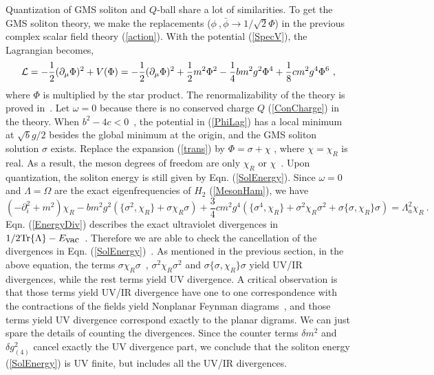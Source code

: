 \documentclass[a4paper,a4paper]{article}
\def\Tr{{\hbox{Tr}}}
\def\bphi{\bar{\phi}} \def\hphi{\hat{\phi}}
\def\hvac{{\hbox{vac}}}
\begin{document}
Quantization of GMS soliton and $Q$-ball share a lot of similarities.  
To get the GMS soliton theory, we make the replacements 
($\phi\ ,\bphi\rightarrow 1/{\sqrt{2}}\Phi$) in the previous
complex scalar field theory (\ref{action}). With the potential (\ref{SpecV}), 
the Lagrangian becomes,
\begin{equation}
  {\cal L}=-\frac 12(\partial_\mu\Phi)^2+V(\Phi)=-\frac 12(\partial_\mu\Phi)^2+\frac 12m^2\Phi^2
-\frac 14bm^2g^2\Phi^4+\frac 18cm^2g^4\Phi^6\ ,                                                     \label{PhiLag}
\end{equation}
where $\Phi$ is multiplied by the star product. The renormalizability of the theory is
proved in~\cite{Chepelev}. Let $\omega=0$ because there is no 
conserved charge $Q$ (\ref{ConCharge}) in the theory. When $b^2-4c<0$\ ,
the potential in (\ref{PhiLag}) has a local minimum at $\sqrt{b}g/2$ besides the global 
minimum at the origin, and the GMS soliton solution $\sigma$ exists. 
Replace the expansion (\ref{trans}) by $\Phi=\sigma+\chi$ , where $\chi=\chi_R$ is 
real. As a result, the meson degrees of freedom are only $\chi_R$ or $\chi$\ . 
Upon quantization, the soliton energy is still given by Eqn. (\ref{SolEnergy}).
Since $\omega=0$ and $\Lambda=\Omega$ are the exact eigenfrequencies of $H_2$ (\ref{MesonHam}),
we have 
\begin{equation}
  (-\partial_i^2+m^2)\chi_R
-bm^2g^2(\{\sigma^2,\chi_R\}+\sigma\chi_R\sigma)
+\frac 34cm^2g^4(\{\sigma^4,\chi_R\}+\sigma^2\chi_R\sigma^2+\sigma\{\sigma,\chi_R\}\sigma)
=\Lambda_{a}^2\chi_R\ . 
\end{equation}
Eqn. (\ref{EnergyDiv}) describes the exact ultraviolet divergences in $1/2\Tr\{\Lambda\}
-E_\hvac$\ . Therefore we are able to check the cancellation of the divergences in Eqn. 
(\ref{SolEnergy})\ . As mentioned in the previous section, in the above equation, 
the terms $\sigma\chi_R\sigma$\ , $\sigma^2\chi_R\sigma^2$ and 
$\sigma\{\sigma,\chi_R\}\sigma$ yield UV/IR divergences, while the rest terms yield UV 
divergence. A critical observation is that those terms yield UV/IR divergence 
have one to one correspondence with the contractions of the fields yield Nonplanar 
Feynman diagrams~\cite{MRS}, and those terms yield UV divergence correspond exactly 
to the planar digrams. We can just spare the details of counting the divergences. 
Since the counter terms $\delta m^2$ and $\delta g^2_{(4)}$ cancel exactly the 
UV divergence part, we conclude that the soliton energy (\ref{SolEnergy}) is    
UV finite, but includes all the UV/IR divergences. 
\end{document}
